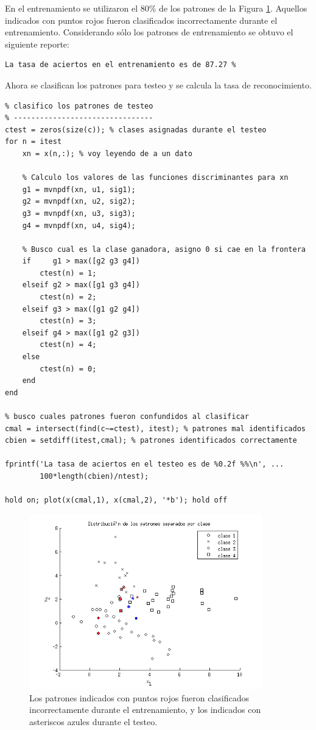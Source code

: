 \documentclass[11pt,a4paper,final]{article}
\begin{document}
En el entrenamiento se utilizaron el 80\% de los patrones de la Figura \ref{fig:ejercicio233}. Aquellos indicados con puntos rojos fueron clasificados incorrectamente durante el entrenamiento. Considerando sólo los patrones de entrenamiento se obtuvo el siguiente reporte:

\color{lightgray} \begin{verbatim}La tasa de aciertos en el entrenamiento es de 87.27 %
\end{verbatim} \color{black}

Ahora se clasifican los patrones para testeo y se calcula la tasa de reconocimiento.

\begin{verbatim}
% clasifico los patrones de testeo
% --------------------------------
ctest = zeros(size(c)); % clases asignadas durante el testeo
for n = itest
    xn = x(n,:); % voy leyendo de a un dato

    % Calculo los valores de las funciones discriminantes para xn
    g1 = mvnpdf(xn, u1, sig1);
    g2 = mvnpdf(xn, u2, sig2);
    g3 = mvnpdf(xn, u3, sig3);
    g4 = mvnpdf(xn, u4, sig4);

    % Busco cual es la clase ganadora, asigno 0 si cae en la frontera
    if     g1 > max([g2 g3 g4])
        ctest(n) = 1;
    elseif g2 > max([g1 g3 g4])
        ctest(n) = 2;
    elseif g3 > max([g1 g2 g4])
        ctest(n) = 3;
    elseif g4 > max([g1 g2 g3])
        ctest(n) = 4;
    else
        ctest(n) = 0;
    end
end

% busco cuales patrones fueron confundidos al clasificar
cmal = intersect(find(c~=ctest), itest); % patrones mal identificados
cbien = setdiff(itest,cmal); % patrones identificados correctamente

fprintf('La tasa de aciertos en el testeo es de %0.2f %%\n', ...
        100*length(cbien)/ntest);

hold on; plot(x(cmal,1), x(cmal,2), '*b'); hold off
\end{verbatim}

\begin{figure}[h]
\includegraphics [width=0.9\textwidth]{Ejercicio2_03.png}
\caption{Los patrones indicados con puntos rojos fueron clasificados incorrectamente durante el entrenamiento, y los indicados con asteriscos azules durante el testeo.}
\label{fig:ejercicio233}
\end{figure}
\end{document}
